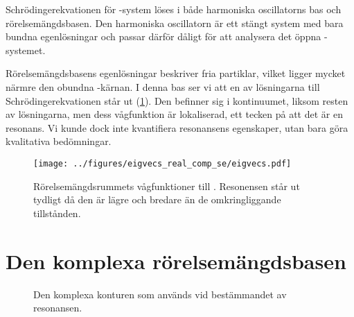 \documentclass[12pt,a4paper]{article}
\begin{document}
Schrödingerekvationen för -system löses i både harmoniska oscillatorns bas och rörelsemängdsbasen. Den harmoniska oscillatorn är ett stängt system med bara bundna egenlösningar och passar därför dåligt för att analysera det öppna -systemet. 

Rörelsemängdsbasens egenlösningar beskriver fria partiklar, vilket ligger mycket närmre den obundna -kärnan. 
I denna bas ser vi att en av lösningarna till Schrödingerekvationen står ut (\cref{fig:resonance_wavfunction}).
Den befinner sig i kontinuumet, liksom resten av lösningarna, men dess vågfunktion är lokaliserad, ett tecken på att det är en resonans.
Vi kunde dock inte kvantifiera resonansens egenskaper, utan bara göra kvalitativa bedömningar.

\begin{figure}[ht]
  \centering
  	\texttt{[image: ../figures/eigvecs\_real\_comp\_se/eigvecs.pdf]}

  \caption{Rörelsemängdsrummets vågfunktioner till . Resonensen står ut tydligt då den är lägre och bredare än de omkringliggande tillstånden.} 
  \label{fig:resonance_wavfunction}
\end{figure}

\begin{figure}[h]
  \label{fig:resonance_wavefunction}
  \end{figure}
  
\section{Den komplexa rörelsemängdsbasen}

\begin{figure}[t]
  \centering
  \caption{Den komplexa konturen som används vid bestämmandet av resonansen.}
  \label{fig:simple_contour}
\end{figure}
\end{document}
